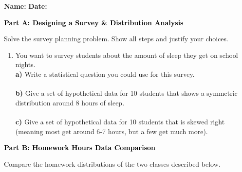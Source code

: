 \documentclass[12pt, letterpaper, fleqn]{article}
\newcommand{\blanklong}{\underline{\hspace{6.5cm}}}
\begin{document}
\textbf{Name:} \underline{\hspace{5cm}}
\hfill
\textbf{Date:} \underline{\hspace{3cm}}\\

\begin{tcolorbox}[colback=black!10]
    \large\textcolor{black}{\textbf{Part A: Designing a Survey \& Distribution Analysis}}
\end{tcolorbox}

\vspace{3mm}

\noindent
Solve the survey planning problem. Show all steps and justify your choices.

\vspace{5mm}

\begin{enumerate}[itemsep=2.2cm, leftmargin=0.6cm]
\item You want to survey students about the amount of sleep they get on school nights. \\
\textbf{a)} Write a statistical question you could use for this survey. \\
\blanklong \\
\textbf{b)} Give a set of hypothetical data for 10 students that shows a symmetric distribution around 8 hours of sleep. \\
\blanklong \\
\textbf{c)} Give a set of hypothetical data for 10 students that is skewed right (meaning most get around 6-7 hours, but a few get much more). \\
\blanklong
\end{enumerate}

\newpage

\begin{tcolorbox}[colback=black!10]
    \large\textcolor{black}{\textbf{Part B: Homework Hours Data Comparison}}
\end{tcolorbox}

\vspace{3mm}

\noindent
Compare the homework distributions of the two classes described below.
\end{document}
